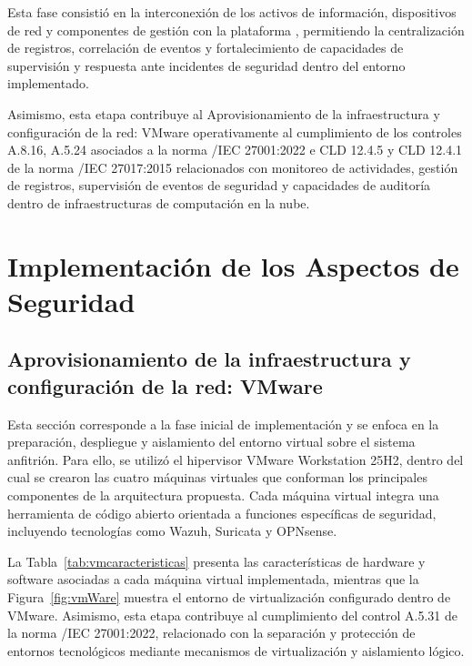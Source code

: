 Esta fase consistió en la interconexión de los activos de información, dispositivos de red y componentes de gestión con la plataforma 
\SIEM, permitiendo la centralización de registros, correlación de eventos y fortalecimiento de capacidades de supervisión y respuesta ante 
incidentes de seguridad dentro del entorno implementado.

Asimismo, esta etapa contribuye al Aprovisionamiento de la infraestructura y configuración de la red: VMware operativamente al cumplimiento de 
los controles A.8.16, A.5.24 asociados a la norma \ISO/IEC 27001:2022 e CLD 12.4.5 y CLD 12.4.1 de la norma \ISO/IEC 27017:2015 
relacionados con monitoreo de actividades, gestión de registros, supervisión de eventos de seguridad y capacidades de auditoría dentro de 
infraestructuras de computación en la nube.


\section{Implementación de los Aspectos de Seguridad}
\noindent


\subsection{Aprovisionamiento de la infraestructura y configuración de la red: VMware}

Esta sección corresponde a la fase inicial de implementación y se enfoca en la preparación, despliegue y aislamiento del entorno virtual 
sobre el sistema anfitrión. Para ello, se utilizó el hipervisor VMware Workstation 25H2, dentro del cual se crearon las cuatro máquinas 
virtuales que conforman los principales componentes de la arquitectura propuesta. Cada máquina virtual integra una herramienta de código 
abierto orientada a funciones específicas de seguridad, incluyendo tecnologías como Wazuh, Suricata y OPNsense.

La Tabla~\ref{tab:vmcaracteristicas} presenta las características de hardware y software asociadas a cada máquina virtual implementada, 
mientras que la Figura~\ref{fig:vmWare} muestra el entorno de virtualización configurado dentro de VMware. Asimismo, esta etapa contribuye 
al cumplimiento del control A.5.31 de la norma \ISO/IEC 27001:2022, relacionado con la separación y protección de entornos tecnológicos 
mediante mecanismos de virtualización y aislamiento lógico.

